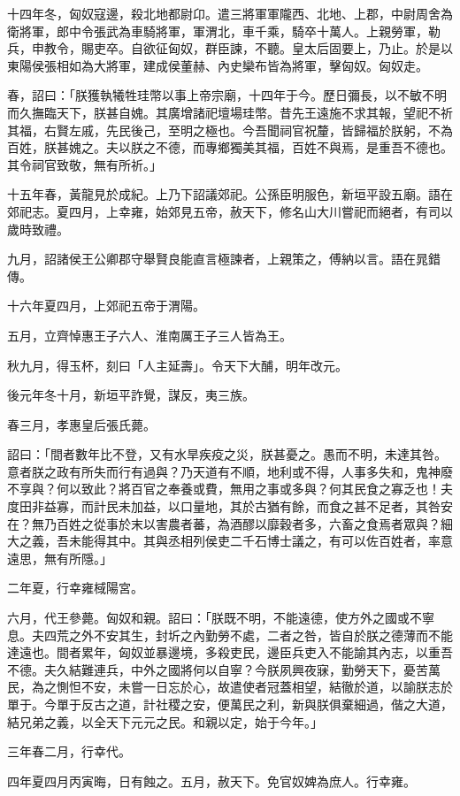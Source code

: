 \begin{pinyinscope}
十四年冬，匈奴寇邊，殺北地都尉卬。遣三將軍軍隴西、北地、上郡，中尉周舍為衛將軍，郎中令張武為車騎將軍，軍渭北，車千乘，騎卒十萬人。上親勞軍，勒兵，申教令，賜吏卒。自欲征匈奴，群臣諫，不聽。皇太后固要上，乃止。於是以東陽侯張相如為大將軍，建成侯董赫、內史欒布皆為將軍，擊匈奴。匈奴走。

春，詔曰：「朕獲執犧牲珪幣以事上帝宗廟，十四年于今。歷日彌長，以不敏不明而久撫臨天下，朕甚自媿。其廣增諸祀壇場珪幣。昔先王遠施不求其報，望祀不祈其福，右賢左戚，先民後己，至明之極也。今吾聞祠官祝釐，皆歸福於朕躬，不為百姓，朕甚媿之。夫以朕之不德，而專鄉獨美其福，百姓不與焉，是重吾不德也。其令祠官致敬，無有所祈。」

十五年春，黃龍見於成紀。上乃下詔議郊祀。公孫臣明服色，新垣平設五廟。語在郊祀志。夏四月，上幸雍，始郊見五帝，赦天下，修名山大川嘗祀而絕者，有司以歲時致禮。

九月，詔諸侯王公卿郡守舉賢良能直言極諫者，上親策之，傅納以言。語在晁錯傳。

十六年夏四月，上郊祀五帝于渭陽。

五月，立齊悼惠王子六人、淮南厲王子三人皆為王。

秋九月，得玉杯，刻曰「人主延壽」。令天下大酺，明年改元。

後元年冬十月，新垣平詐覺，謀反，夷三族。

春三月，孝惠皇后張氏薨。

詔曰：「間者數年比不登，又有水旱疾疫之災，朕甚憂之。愚而不明，未達其咎。意者朕之政有所失而行有過與？乃天道有不順，地利或不得，人事多失和，鬼神廢不享與？何以致此？將百官之奉養或費，無用之事或多與？何其民食之寡乏也！夫度田非益寡，而計民未加益，以口量地，其於古猶有餘，而食之甚不足者，其咎安在？無乃百姓之從事於末以害農者蕃，為酒醪以靡穀者多，六畜之食焉者眾與？細大之義，吾未能得其中。其與丞相列侯吏二千石博士議之，有可以佐百姓者，率意遠思，無有所隱。」

二年夏，行幸雍棫陽宮。

六月，代王參薨。匈奴和親。詔曰：「朕既不明，不能遠德，使方外之國或不寧息。夫四荒之外不安其生，封圻之內勤勞不處，二者之咎，皆自於朕之德薄而不能達遠也。間者累年，匈奴並暴邊境，多殺吏民，邊臣兵吏入不能諭其內志，以重吾不德。夫久結難連兵，中外之國將何以自寧？今朕夙興夜寐，勤勞天下，憂苦萬民，為之惻怛不安，未嘗一日忘於心，故遣使者冠蓋相望，結徹於道，以諭朕志於單于。今單于反古之道，計社稷之安，便萬民之利，新與朕俱棄細過，偕之大道，結兄弟之義，以全天下元元之民。和親以定，始于今年。」

三年春二月，行幸代。

四年夏四月丙寅晦，日有蝕之。五月，赦天下。免官奴婢為庶人。行幸雍。


\end{pinyinscope}
